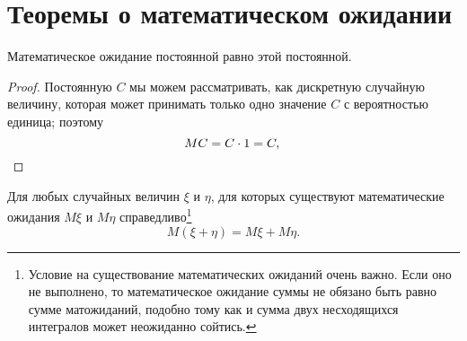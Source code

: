 \section{Теоремы о математическом ожидании}
\begin{thm}\label{ch31.3thm1}
Математическое ожидание постоянной равно этой постоянной.
\end{thm}
\begin{proof}
Постоянную $C$ мы можем рассматривать, как дискретную случайную величину, которая может принимать только одно значение $C$ с вероятностью единица; поэтому
\begin{equation*}
M C = C\cdot1=C, \qedhere
\end{equation*}
\end{proof}
\begin{thm}\label{ch31.2t1}
Для любых случайных величин $\xi$ и $\eta$, для которых существуют математические ожидания $M\xi$ и $M\eta$ справедливо\footnote{Условие на существование математических ожиданий очень важно. Если оно не выполнено, то математическое ожидание суммы не обязано быть равно сумме матожиданий, подобно тому как и сумма двух несходящихся интегралов может неожиданно сойтись.}
\begin{equation}
M(\xi+\eta) = M\xi+M\eta.
\end{equation}
\end{thm}
